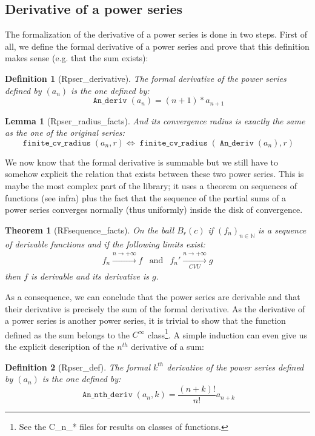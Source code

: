 \documentclass[submission,copyright]{eptcs}
\newcommand{\N}{\mathbb{N}}
\DeclareMathOperator{\D}{\mathtt{An\_deriv}}
\DeclareMathOperator{\Dn}{\mathtt{An\_nth\_deriv}}
\DeclareMathOperator{\fcvr}{\mathtt{finite\_cv\_radius}}
\newtheorem{definition}{Definition}
\newtheorem{lemma}{Lemma}
\newtheorem{theorem}{Theorem}
\begin{document}
\subsection{Derivative of a power series}

The formalization of the derivative of a power series is done in two steps.
First of all, we define the formal derivative of a power series and prove
that this definition makes sense (e.g. that the sum exists):

\begin{definition}[Rpser\_derivative] The formal derivative of the power
series defined by $(a_n)$ is the one defined by:
$$\D{}(a_n) = (n + 1) * a_{n+1}$$
\end{definition}

\begin{lemma}[Rpser\_radius\_facts] And its convergence radius is exactly
the same as the one of the original series: $$\fcvr{}(a_n,r) \Leftrightarrow
\fcvr{}(\D{}(a_n),r)$$\end{lemma}

We now know that the formal derivative is summable but we still have to
somehow explicit the relation that exists between these two power series.
This is maybe the most complex part of the library; it uses a theorem on
sequences of functions (see infra) plus the fact that the sequence of
the partial sums of a power series converges normally (thus uniformly)
inside the disk of convergence.

\begin{theorem}[RFsequence\_facts] On the ball $B_r(c)$ if
$(f_n)_{n \in \N}$ is a sequence of derivable functions and if the
following limits exist: $$ \begin{array}{ccc}
f_n \xrightarrow{n \to +\infty} f & \text{and} &
f_n' \xrightarrow[CVU]{n \to +\infty} g\end{array}$$ then $f$ is
derivable and its derivative is $g$.\end{theorem}

As a consequence, we can conclude that the power series are derivable
and that their derivative is precisely the sum of the formal derivative.
As the derivative of a power series is another power series, it is
trivial to show that the function defined as the sum belongs to the
$C^{\infty}$ class\footnote{See the C\_n\_* files for results on
classes of functions.}. A simple induction can even give us the explicit
description of the $n^{th}$ derivative of a sum:

\begin{definition}[Rpser\_def] The formal $k^{th}$ derivative of the power
series defined by $(a_n)$ is the one defined by:
$$\Dn{}(a_n,k)  = \frac{(n + k)!}{n!} a_{n+k}$$
\end{definition}
\end{document}
